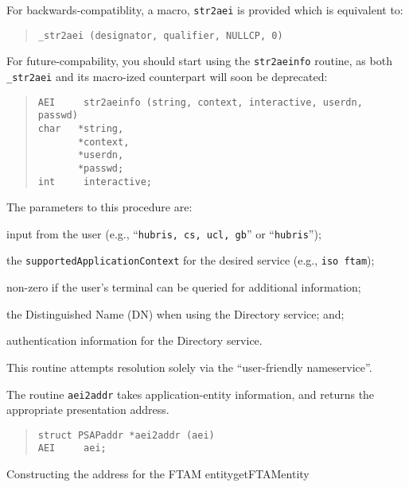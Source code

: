 For backwards-compatiblity,
a macro, \verb"str2aei" is provided which is equivalent to:
\begin{quote}\small\begin{verbatim}
_str2aei (designator, qualifier, NULLCP, 0)
\end{verbatim}\end{quote}

For future-compability,
you should start using the \verb"str2aeinfo" routine,
as both \verb"_str2aei" and its macro-ized counterpart will soon be deprecated:
\begin{quote}\small\begin{verbatim}
AEI     str2aeinfo (string, context, interactive, userdn, passwd)
char   *string,
       *context,
       *userdn,
       *passwd;
int     interactive;
\end{verbatim}\end{quote}
The parameters to this procedure are:
\begin{describe}
\item[\verb"string":] input from the user
(e.g., ``\verb"hubris, cs, ucl, gb"'' or ``\verb"hubris"'');

\item[\verb"context":] the \verb"supportedApplicationContext" for the desired
service (e.g., \verb"iso ftam");

\item[\verb"interactive":] non-zero if the user's terminal can be queried for
additional information;

\item[\verb"userdn":] the Distinguished Name (DN) when using the Directory
service;
and;

\item[\verb"passwd":] authentication information for the Directory service.
\end{describe}
This routine attempts resolution solely via the ``user-friendly nameservice''.

The routine \verb"aei2addr" takes application-entity information,
and returns the appropriate presentation address.
\begin{quote}\small\begin{verbatim}
struct PSAPaddr *aei2addr (aei)
AEI     aei;
\end{verbatim}\end{quote}
%
	{Constructing the address for the FTAM entity}{getFTAMentity}

